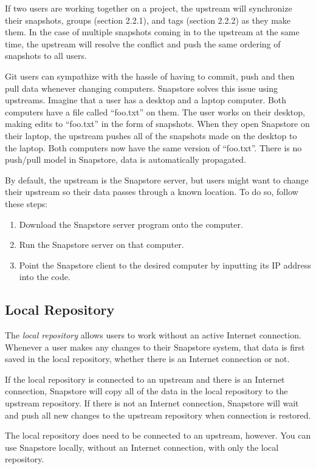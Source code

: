 If two users are working together on a project, the upstream will synchronize their snapshots, groups (section 2.2.1), and tags (section 2.2.2) as they make them. In the case of multiple snapshots coming in to the upstream at the same time, the upstream will resolve the conflict and push the same ordering of snapshots to all users.

Git users can sympathize with the hassle of having to commit, push and then pull data whenever changing computers. Snapstore solves this issue using upstreams. Imagine that a user has a desktop and a laptop computer. Both computers have a file called ``foo.txt'' on them. The user works on their desktop, making edits to ``foo.txt'' in the form of snapshots. When they open Snapstore on their laptop, the upstream pushes all of the snapshots made on the desktop to the laptop. Both computers now have the same version of ``foo.txt''. There is no push/pull model in Snapstore, data is automatically propagated.

By default, the upstream is the Snapstore server, but users might want to change their upstream so their data passes through a known location. To do so, follow these steps:
\begin{enumerate}
  \item{Download the Snapstore server program onto the computer.}
  \item{Run the Snapstore server on that computer.}
  \item{Point the Snapstore client to the desired computer by inputting its IP address into the code.}
\end{enumerate}

\subsection{Local Repository}

The \textit{local repository} allows users to work without an active Internet connection. Whenever a user makes any changes to their Snapstore system, that data is first saved in the local repository, whether there is an Internet connection or not. 

If the local repository is connected to an upstream and there is an Internet connection, Snapstore will copy all of the data in the local repository to the upstream repository. If there is not an Internet connection, Snapstore will wait and push all new changes to the upstream repository when connection is restored.

The local repository does need to be connected to an upstream, however. You can use Snapstore locally, without an Internet connection, with only the local repository.

